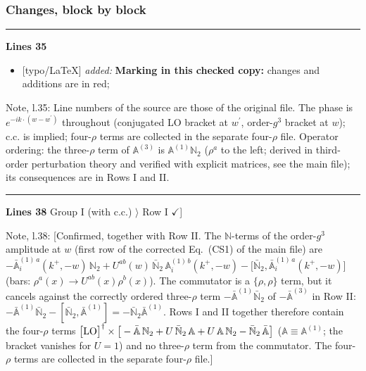 \documentclass[10pt]{article}
\newenvironment{notebox}{\def\FrameCommand{{\color{notebar}\vrule width 1.5pt}\hspace{6pt}}\MakeFramed{\advance\hsize-\width\FrameRestore}\small}{\endMakeFramed}
\def\mf#1{\mathbb{#1}}
\begin{document}
\subsubsection*{Changes, block by block}
\noindent\rule{\linewidth}{0.3pt}\par\noindent\textbf{Lines 35}\par
\begin{itemize}[leftmargin=2.2em,itemsep=1pt,topsep=2pt]
\item[\textbf{l.35}] \textsf{\small [typo/LaTeX]} \emph{added:} \textbf{Marking in this checked copy:} changes and additions are in red;
\end{itemize}
\begin{notebox}\textsf{\small Note, l.35:} Line numbers of the source are those of the original file. The phase is $e^{-ik\cdot(w-w^{\prime})}$ throughout (conjugated LO bracket at $w^{\prime}$, order-$g^{3}$ bracket at $w$); c.c. is implied; four-$\rho$ terms are collected in the separate four-$\rho$ file. Operator ordering: the three-$\rho$ term of $\mf{A}^{(3)}$ is $\mf{A}^{(1)}\mf{N}_{2}$ ($\rho^{a}$ to the left; derived in third-order perturbation theory and verified with explicit matrices, see the main file); its consequences are in Rows I and II.\end{notebox}
\noindent\rule{\linewidth}{0.3pt}\par\noindent\textbf{Lines 38} \quad \textsf{Group I (with c.c.) $\rangle$ Row I { $\checkmark$]}}\par
\begin{notebox}\textsf{\small Note, l.38:} [Confirmed, together with Row II. The $\mf{N}$-terms of the order-$g^{3}$ amplitude at $w$ (first row of the corrected Eq.~(CS1) of the main file) are $-\bar{\mf{A}}^{(1)\,a}_{i}(k^{+},-w)\,\mf{N}_{2}+U^{ab}(w)\,\bar{\mf{N}}_{2}\,\mf{A}^{(1)\,b}_{i}(k^{+},-w)-\big[\bar{\mf{N}}_{2},\bar{\mf{A}}^{(1)\,a}_{i}(k^{+},-w)\big]$ (bars: $\rho^{a}(x)\to U^{ab}(x)\rho^{b}(x)$). The commutator is a $\{\rho,\rho\}$ term, but it cancels against the correctly ordered three-$\rho$ term $-\bar{\mf{A}}^{(1)}\bar{\mf{N}}_{2}$ of $-\bar{\mf{A}}^{(3)}$ in Row II: $-\bar{\mf{A}}^{(1)}\bar{\mf{N}}_{2}-[\bar{\mf{N}}_{2},\bar{\mf{A}}^{(1)}]=-\bar{\mf{N}}_{2}\bar{\mf{A}}^{(1)}$. Rows I and II together therefore contain the four-$\rho$ terms $\big[{\rm LO}\big]^{\dagger}\times\big[-\bar{\mf{A}}\,\mf{N}_{2}+U\,\bar{\mf{N}}_{2}\,\mf{A}+U\,\mf{A}\,\mf{N}_{2}-\bar{\mf{N}}_{2}\,\bar{\mf{A}}\big]$ ($\mf{A}\equiv\mf{A}^{(1)}$; the bracket vanishes for $U=1$) and no three-$\rho$ term from the commutator. The four-$\rho$ terms are collected in the separate four-$\rho$ file.]\end{notebox}
\end{document}
